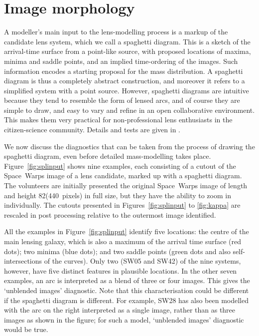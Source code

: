 
\section{Image morphology}
\label{sec:morph}

A modeller's main input to the lens-modelling process is a markup of
the candidate lens system, which we call a spaghetti diagram.
This is a sketch of the arrival-time surface from a point-like source,
with proposed locations of maxima, minima and saddle points, and an
implied time-ordering of the images.  Such information encodes a
starting proposal for the mass distribution.  A spaghetti diagram is
thus a completely abstract construction, and moreover it refers to a
simplified system with a point source.  However, spaghetti diagrams
are intuitive because they tend to resemble the form of lensed arcs,
and of course they are simple to draw, and easy to vary and refine in
an open collaborative environment.  This makes them very practical for
non-professional lens enthusiasts in the citizen-science community.
Details and tests are given in \cite{2015MNRAS.447.2170K}.

We now discuss the diagnostics that can be taken from the process of
drawing the spaghetti diagram, even before detailed mass-modelling
takes place.  Figure~\ref{fig:splinput} shows nine examples, each
consisting of a cutout of the Space~Warps image of a lens candidate,
marked up with a spaghetti diagram.
The volunteers are initially presented the original Space~Warps image of
length and height 82\arcsec (440~pixels) in full size, but they have the
ability to zoom in individually.
The cutouts presented in Figures~\ref{fig:splinput} to \ref{fig:kappa}
are rescaled in post processing relative to the outermost image identified.

All the examples in Figure~\ref{fig:splinput} identify five locations:
the centre of the main lensing galaxy, which is also a maximum of the
arrival time surface (red dots); two minima (blue dots); and two
saddle points (green dots and also self-intersections of the curves).
Only two (SW05 and SW42) of the nine systems, however, have five
distinct features in plausible locations.  In the other seven
examples, an arc is interpreted as a blend of three or four images.
This gives the `unblended images' diagnostic.  Note that this
characterisation could be different if the spaghetti diagram is
different.  For example, SW28 has also been modelled with the arc on
the right interpreted as a single image, rather than as three images
as shown in the figure; for such a model, `unblended images'
diagnostic would be true.

